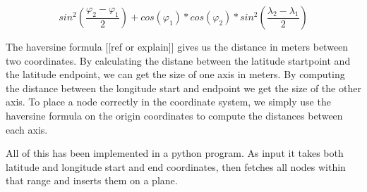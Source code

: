 \[
	sin^2\left(\frac{\varphi_2-\varphi_1}{2} \right) + cos(\varphi_1) * cos(\varphi_2) * sin^2 \left( \frac{\lambda_2 - \lambda_1}{2} \right)
\]	


The haversine formula [[ref or explain]] gives us the distance in meters between two coordinates. By calculating
the distane between the latitude startpoint and the latitude endpoint, we can get the size of one
axis in meters. By computing the distance between the longitude start and endpoint we get the size of the
other axis. To place a node correctly in the coordinate system, we simply use the haversine formula on the
origin coordinates to compute the distances between each axis. 

All of this has been implemented in a python program. As input it takes both latitude and longitude start and end coordinates,
    then fetches all nodes within that range and inserts them on a plane. 


